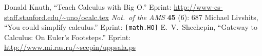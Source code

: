 

\vfill\eject
{} 
\begin{thebibliography}{99}
 Donald Knuth,\newblock
``Teach Calculus with Big O.''\newblock
Eprint: \url{http://www-cs-staff.stanford.edu/~uno/ocalc.tex}\newblock
\emph{Not.\ of the AMS} {\bf45} (6): 687
 Michael Livshits, \newblock
``You could simplify calculus.''\newblock
Eprint:  \texttt{[math.HO]}
E.\ V.\ Shechepin,\newblock
``Gateway to Calculus: On Euler's Footsteps.''\newblock
Eprint: \url{http://www.mi.ras.ru/~scepin/uppsala.ps}
\end{thebibliography}
